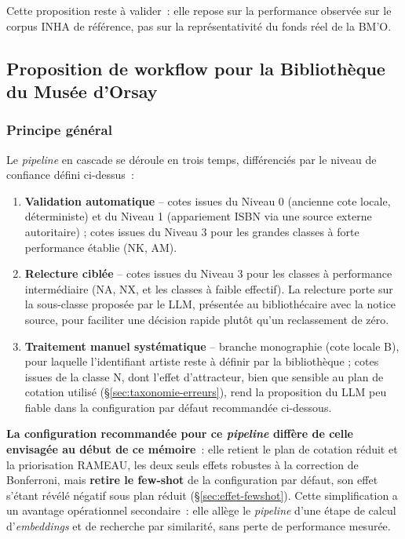 Cette proposition reste à valider~: elle repose sur la performance observée sur le corpus INHA de référence, pas sur la représentativité du fonds réel de la BM'O.

\subsection{Proposition de workflow pour la Bibliothèque du Musée d'Orsay}
\label{sec:workflow}

\subsubsection*{Principe général}

Le \textit{pipeline} en cascade se déroule en trois temps, différenciés par le niveau de confiance défini ci-dessus~:

\begin{enumerate}
\item \textbf{Validation automatique} -- cotes issues du Niveau 0 (ancienne cote locale, déterministe) et du Niveau 1 (appariement ISBN via une source externe autoritaire) ; cotes issues du Niveau 3 pour les grandes classes à forte performance établie (NK, AM).
\item \textbf{Relecture ciblée} -- cotes issues du Niveau 3 pour les classes à performance intermédiaire (NA, NX, et les classes à faible effectif). La relecture porte sur la sous-classe proposée par le LLM, présentée au bibliothécaire avec la notice source, pour faciliter une décision rapide plutôt qu'un reclassement de zéro.
\item \textbf{Traitement manuel systématique} -- branche monographie (cote locale B), pour laquelle l'identifiant artiste reste à définir par la bibliothèque ; cotes issues de la classe N, dont l'effet d'attracteur, bien que sensible au plan de cotation utilisé (\S\ref{sec:taxonomie-erreurs}), rend la proposition du LLM peu fiable dans la configuration par défaut recommandée ci-dessous.
\end{enumerate}

\textbf{La configuration recommandée pour ce \textit{pipeline} diffère de celle envisagée au début de ce mémoire}~: elle retient le plan de cotation réduit et la priorisation RAMEAU, les deux seuls effets robustes à la correction de Bonferroni, mais \textbf{retire le few-shot} de la configuration par défaut, son effet s'étant révélé négatif sous plan réduit (\S\ref{sec:effet-fewshot}). Cette simplification a un avantage opérationnel secondaire~: elle allège le \textit{pipeline} d'une étape de calcul d'\textit{embeddings} et de recherche par similarité, sans perte de performance mesurée.

